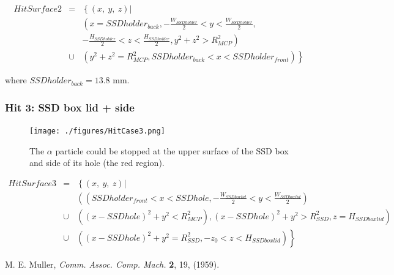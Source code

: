 \documentclass{article}
\begin{document}
\begin{eqnarray*}
	HitSurface2 & = & \left\{(x,~y,~z) \right| \\
	& & \left( x=SSDholder_{back}, -\frac{W_{SSDholder}}{2}  < y < \frac{W_{SSDholder}}{2},\right. \\
	& & \left. -\frac{H_{SSDholder}}{2} < z < \frac{H_{SSDholder}}{2}, y^2+z^2 > R_{MCP}^2 \right) \\
	& \cup & \left. \left( y^2+z^2 = R_{MCP}^2, SSDholder_{back} < x < SSDholder_{front} \right) \right\}
\end{eqnarray*}

where $SSDholder_{back} = 13.8$ mm.

\subsubsection{Hit 3: SSD box lid + side}

\begin{figure}[H]
  \begin{center}
    \texttt{[image: ./figures/HitCase3.png]}
	  \caption{The $\alpha$ particle could be stopped at the upper surface of the SSD box and side of its hole (the red region).}
    \label{fig:HitCase3}
  \end{center}
\end{figure}

\begin{eqnarray*}
	HitSurface3 & = & \left\{(x,~y,~z) \right| \\
	& & \left( \left( SSDholder_{front} < x < SSDhole, -\frac{W_{SSDboxlid}}{2} < y < \frac{W_{SSDboxlid}}{2} \right) \right. \\
	& \cup & \left. \left( (x-SSDhole)^2+y^2<R_{MCP}^2 \right), (x-SSDhole)^2+y^2 > R_{SSD}^2, z = H_{SSDboxlid} \right) \\
	& \cup & \left. \left( (x-SSDhole)^2+y^2 = R_{SSD}^2, -z_0 < z < H_{SSDboxlid} \right) \right\}
\end{eqnarray*}


\begin{thebibliography}{9}
	 M. E. Muller, {\it Comm. Assoc. Comp. Mach.} {\bf 2}, 19, (1959).
\end{thebibliography}
\end{document}
